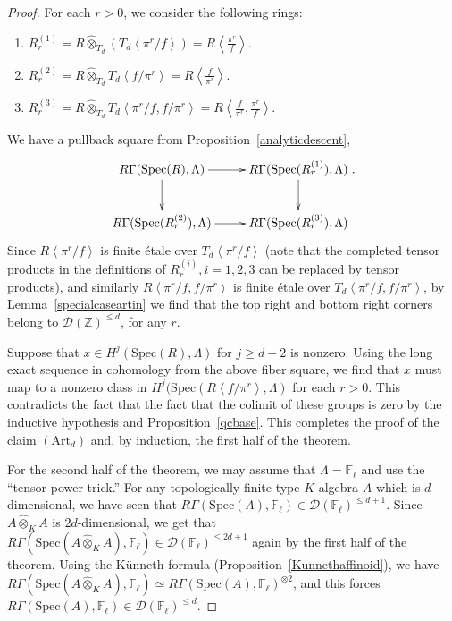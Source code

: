 \documentclass[reqno]{amsart}
\newcommand{\spec}{\mathrm{Spec}}
\newcommand{\D}{\mathcal{D}}
\theoremstyle{definition}
\begin{document}
\begin{proof}
For each $r  > 0$, we consider the following rings: 
\begin{enumerate}

\item   $R_r^{(1)} = R \hat{\otimes}_{T_d} \left(T_d\left \langle
\pi^r/f\right\rangle\right) = R\left \langle \frac{\pi^r}{f}\right\rangle$. 

\item $R_r^{(2)} = R \hat{\otimes}_{T_d} T_d\left \langle f/\pi^r\right\rangle = R \left \langle \frac{f}{\pi^r}\right\rangle$. 

\item  $R_r^{(3)} = R \hat{\otimes}_{T_d} T_d\left \langle \pi^r/f,  f/\pi^r\right\rangle = R\left \langle \frac{f}{\pi^r}, \frac{\pi^r}{f}\right\rangle$. 

\end{enumerate}

We have a pullback square
from Proposition~\ref{analyticdescent}, 
\[ \xymatrix{
R \Gamma( \spec(R) , \Lambda) \ar[d]  \ar[r] &  R \Gamma( \spec(R_r^{(1)}),
\Lambda) \ar[d]  \\
R \Gamma( \spec(R_r^{(2)}), \Lambda) \ar[r] &  R \Gamma( \spec(R_r^{(3)}),
\Lambda)
}.\]
Since $R\left \langle \pi^r/f\right\rangle$ is finite \'etale over $T_d\left
\langle \pi^r/f\right\rangle$ (note that the completed tensor products in the definitions
of $R_r^{(i)}, i = 1, 2, 3$ can be replaced by tensor products), and similarly $R\left \langle \pi^r/f,
f/\pi^r\right\rangle$ is finite \'etale over $T_d \left \langle \pi^r/f,
f/\pi^r\right\rangle$, by Lemma~\ref{specialcaseartin} we find that the top right and bottom right
corners belong to $\D(\mathbb{Z})^{\leq d}$, for any $r$. 

Suppose that $x \in H^{j}( \spec(R), \Lambda)$ for $j \geq d + 2$ is nonzero. Using the long
exact sequence in cohomology from the above fiber square, we find that 
$x$ must map to a nonzero class in $H^j( \spec( R \left \langle
f/\pi^r\right\rangle, \Lambda)$ for each $r > 0$. This contradicts the fact that
the fact that the colimit of these groups is zero by the inductive hypothesis
and Proposition~\ref{qcbase}. 
This completes the proof of the claim $(\mathrm{Art}_d)$ and, by induction, the
first half of the theorem. 

For the second half of the theorem, we may assume that $\Lambda = \mathbb{F}_\ell$
and use the ``tensor power trick.'' 
For any topologically finite type $K$-algebra $A$ which is $d$-dimensional, we have seen that 
$R \Gamma( \spec(A), \mathbb{F}_\ell) \in \D(\mathbb{F}_\ell)^{\leq d+1}$. 
Since $A \hat{\otimes}_K A$ is $2d$-dimensional, we get that 
$R \Gamma ( \spec( A \hat{\otimes}_K A) , \mathbb{F}_\ell)  \in \D(
\mathbb{F}_\ell)^{\leq 2d + 1}$ again by the first half of the theorem. Using the K\"unneth formula
(Proposition~\ref{Kunnethaffinoid}), we have 
$R \Gamma ( \spec( A \hat{\otimes}_K A) , \mathbb{F}_\ell)  \simeq 
R \Gamma ( \spec( A ) , \mathbb{F}_\ell)^{\otimes 2}$, 
and
this forces $R \Gamma( \spec(A), \mathbb{F}_\ell) \in \D(\mathbb{F}_\ell)^{\leq d}$. 
\end{proof}
\end{document}
